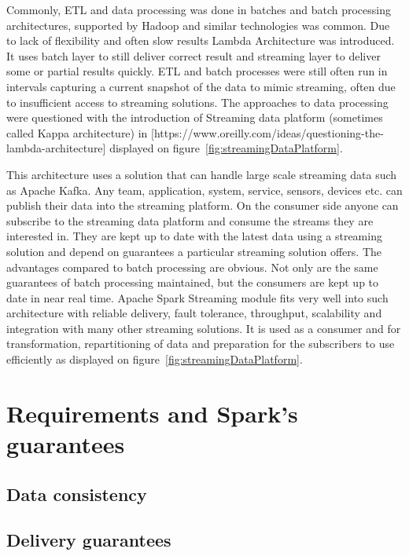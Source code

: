 \documentclass[a4paper, 10 pt, conference]{IEEEtran}
\begin{document}
Commonly, ETL and data processing was done in batches and batch processing architectures, supported by Hadoop and similar technologies was common. Due to lack of flexibility and often slow results Lambda Architecture was introduced. It uses batch layer to still deliver correct result and streaming layer to deliver some or partial results quickly.
ETL and batch processes were still often run in intervals capturing a current snapshot of the data to mimic streaming, often due to insufficient access to streaming solutions. The approaches to data processing were questioned with the introduction of Streaming data platform (sometimes called Kappa architecture) in [https://www.oreilly.com/ideas/questioning-the-lambda-architecture] displayed on figure~\ref{fig:streamingDataPlatform}.

This architecture uses a solution that can handle large scale streaming data such as Apache Kafka. Any team, application, system, service, sensors, devices etc. can publish their data into the streaming platform. On the consumer side anyone can subscribe to the streaming data platform and consume the streams they are interested in. They are kept up to date with the latest data using a streaming solution and depend on guarantees a particular streaming solution offers.
The advantages compared to batch processing are obvious. Not only are the same guarantees of batch processing maintained, but the consumers are kept up to date in near real time.
Apache Spark Streaming module fits very well into such architecture with reliable delivery, fault tolerance, throughput, scalability and integration with many other streaming solutions. It is used as a consumer and for transformation, repartitioning of data and preparation for the subscribers to use efficiently as displayed on figure~\ref{fig:streamingDataPlatform}.

\section{Requirements and Spark's guarantees}

\subsection{Data consistency}

\subsection{Delivery guarantees}
\end{document}

